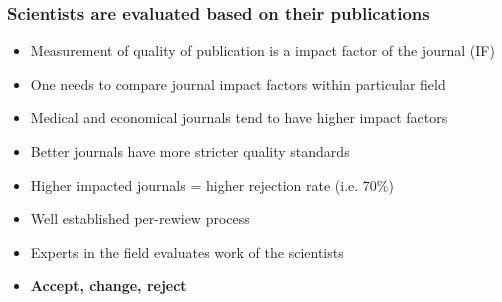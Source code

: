 \begin{frame}
\frametitle{Scientists are evaluated based on their publications}
\begin{itemize}
\item Measurement of quality of publication is a impact factor of the journal (IF)
\item One needs to compare journal impact factors within particular field
\item Medical and economical journals tend to have higher impact factors
\item Better journals have more stricter quality standards
\item Higher impacted journals = higher rejection rate (i.e. 70\%)
\item Well established per-rewiew process
\item Experts in the field evaluates work of the scientists
\item \textbf{Accept, change, reject}
\end{itemize}
\end{frame}

